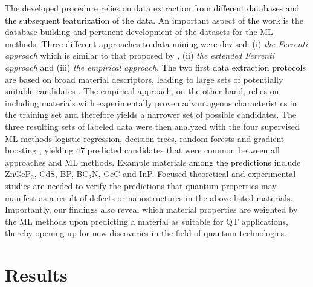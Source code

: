 \documentclass[superscriptaddress,unsortedaddress,
 amsmath,amssymb,
 aps,
]{revtex4-2}
\newcommand{\mrk}[1]{\textcolor{black}{#1}}
\begin{document}
The developed procedure relies on data extraction \mrk{from different databases and the subsequent featurization of the data.} 
An important aspect of \mrk{the} work is the database building and pertinent development of the datasets for the ML methods. \mrk{Three different approaches to data mining were devised}: (i) \emph{the Ferrenti approach} which is similar to that proposed by \citeauthor{Ferrenti2020} \cite{Ferrenti2020}, (ii) \emph{the extended Ferrenti approach} and (iii) \emph{the empirical approach}. \mrk{The} two first \mrk{data extraction protocols are based on} broad material descriptors, leading to large sets of potentially suitable candidates \cite{Mehta2019,Hastie2009}. The empirical approach, on the other hand, relies on including materials with experimentally proven advantageous characteristics in the training set and therefore yields a narrower set of possible candidates. The three resulting sets of labeled data were then analyzed with the four supervised ML methods logistic regression, decision trees, random forests and gradient boosting \cite{Hastie2009,Murphy2012}, yielding \mrk{$47$} predicted candidates that were common between all approaches and ML methods.
Example materials \mrk{among the predictions} include ZnGeP$_2$, CdS, BP, BC$_2$N, GeC and InP. Focused theoretical and experimental studies 
\mrk{are needed} to verify the predictions that quantum properties may manifest as a result of defects or nanostructures in the above listed materials. 
Importantly, our findings also reveal which material properties are weighted by the ML methods upon predicting a material as suitable for QT applications, thereby opening up for new  discoveries in the field of quantum technologies. 


\section*{Results}
\end{document}
